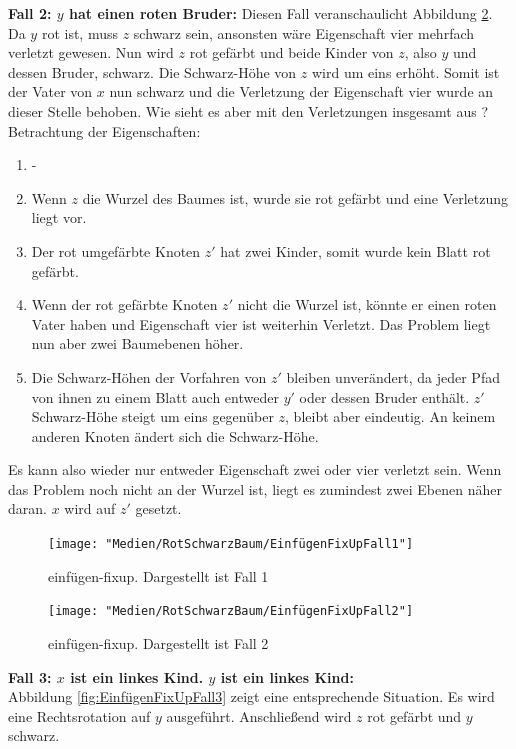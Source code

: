 \documentclass[a4paper,12pt]{article}
\begin{document}
\noindent\textbf{Fall 2: $y$ hat einen roten Bruder: }
\noindent Diesen Fall veranschaulicht Abbildung \ref{fig:EinfügenFixUpFall2}. Da $y$ rot ist, muss $z$ schwarz sein, ansonsten wäre Eigenschaft vier mehrfach verletzt gewesen. Nun wird $z$ rot gefärbt und beide Kinder von $z$, also $y$ und dessen Bruder, schwarz. Die Schwarz-Höhe von $z$ wird um eins erhöht. Somit ist der Vater von $x$ nun schwarz und die Verletzung der Eigenschaft vier wurde an dieser Stelle behoben. Wie sieht es aber mit den Verletzungen insgesamt aus ? \\

Betrachtung der Eigenschaften:

\begin{enumerate}
	\item -
	\item Wenn $z$ die Wurzel des Baumes ist, wurde sie rot gefärbt und eine Verletzung liegt vor.
	\item Der rot umgefärbte Knoten $z'$ hat zwei Kinder, somit wurde kein Blatt rot gefärbt.
	\item  Wenn der rot gefärbte Knoten $z'$ nicht die Wurzel ist, könnte er einen roten Vater haben und Eigenschaft vier ist weiterhin Verletzt. Das Problem liegt nun aber zwei Baumebenen höher.
	\item  Die Schwarz-Höhen der Vorfahren von $z'$ bleiben unverändert, da jeder Pfad von ihnen zu einem Blatt auch entweder $y'$ oder dessen Bruder enthält. $z'$ Schwarz-Höhe steigt um eins gegenüber $z$, bleibt aber eindeutig. An keinem anderen Knoten ändert sich die Schwarz-Höhe. 

\end{enumerate} 
Es kann also wieder nur entweder Eigenschaft zwei oder vier verletzt sein. Wenn das Problem noch nicht an der Wurzel ist, liegt es zumindest zwei Ebenen näher daran. $x$ wird auf $z'$ gesetzt. 
\begin{figure}[H]
	\centering
	\texttt{[image: "Medien/RotSchwarzBaum/EinfügenFixUpFall1"]}
	\caption{einfügen-fixup. Dargestellt ist Fall 1  }
	\label{fig:EinfügenFixUpFall1}
\end{figure}
\begin{figure}[h]
	\centering
	\texttt{[image: "Medien/RotSchwarzBaum/EinfügenFixUpFall2"]}
	\caption{einfügen-fixup. Dargestellt ist Fall 2  }
	\label{fig:EinfügenFixUpFall2}
\end{figure}

\noindent\textbf{Fall 3: $x$ ist ein linkes Kind. $y$ ist ein linkes Kind: }\\
\noindent Abbildung \ref{fig:EinfügenFixUpFall3} zeigt eine entsprechende Situation. Es wird eine Rechtsrotation auf $y$ ausgeführt. Anschließend wird $z$ rot gefärbt und $y$ schwarz. \\
\end{document}
